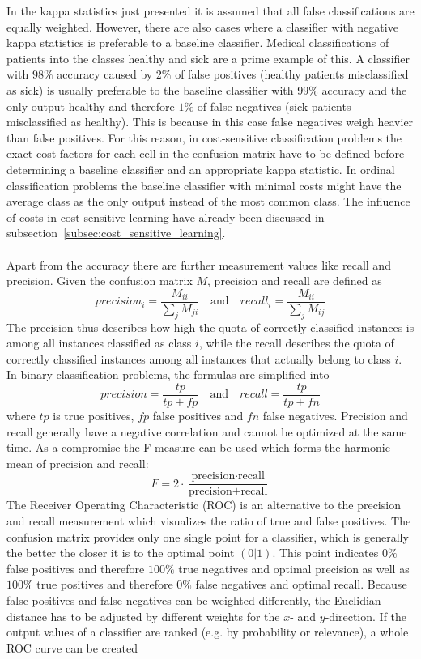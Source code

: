 \documentclass[article,type=msc,colorback,accentcolor=tud7b]{tudthesis}
\begin{document}
    In the kappa statistics just presented it is assumed that all false classifications are equally weighted. However, there are also cases where a classifier with negative kappa statistics is preferable to a baseline classifier. Medical classifications of patients into the classes healthy and sick are a prime example of this. A classifier with $98\%$ accuracy caused by $2\%$ of false positives (healthy patients misclassified as sick) is usually preferable to the baseline classifier with $99\%$ accuracy and the only output healthy and therefore $1\%$ of false negatives (sick patients misclassified as healthy). This is because in this case false negatives weigh heavier than false positives. For this reason, in cost-sensitive classification problems the exact cost factors for each cell in the confusion matrix have to be defined before determining a baseline classifier and an appropriate kappa statistic. In ordinal classification problems the baseline classifier with minimal costs might have the average class as the only output instead of the most common class. The influence of costs in cost-sensitive learning have already been discussed in subsection~\ref{subsec:cost_sensitive_learning}. \\\\
    Apart from the accuracy there are further measurement values like recall and precision. Given the confusion matrix $M$, precision and recall are defined as
    \[precision_{i}=\frac{M_{i i}}{\sum_{j}M_{ji}} \quad \textrm{and} \quad recall_{i}=\frac{M_{i i}}{\sum_{j}M_{ij}}\]
    The precision thus describes how high the quota of correctly classified instances is among all instances classified as class $i$, while the recall describes the quota of correctly classified instances among all instances that actually belong to class $i$. In binary classification problems, the formulas are simplified into
    \[precision=\frac{tp}{tp+fp} \quad \textrm{and} \quad recall=\frac{tp}{tp+fn}\]
    where $tp$ is true positives, $fp$ false positives and $fn$ false negatives. Precision and recall generally have a negative correlation and cannot be optimized at the same time. As a compromise the F-measure can be used which forms the harmonic mean of precision and recall:
    \[F=2\cdot\frac{\text{precision}\cdot\text{recall}}{\text{precision}+\text{recall}}\]
    The Receiver Operating Characteristic (ROC) is an alternative to the precision and recall measurement which visualizes the ratio of true and false positives. The confusion matrix provides only one single point for a classifier, which is generally the better the closer it is to the optimal point $(0|1)$. This point indicates $0\%$ false positives and therefore $100\%$ true negatives and optimal precision as well as $100\%$ true positives and therefore $0\%$ false negatives and optimal recall. Because false positives and false negatives can be weighted differently, the Euclidian distance has to be adjusted by different weights for the $x$- and $y$-direction. If the output values of a classifier are ranked (e.g. by probability or relevance), a whole ROC curve can be created
\end{document}
